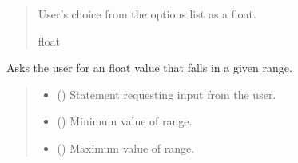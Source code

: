 \documentclass[letterpaper,10pt,english]{sphinxmanual}
\begin{document}
\begin{fulllineitems}
\begin{fulllineitems}
\begin{quote}
\begin{description}
\begin{itemize}
\end{itemize}

\sphinxAtStartPar
User’s choice from the options list as a float.

\sphinxAtStartPar
float

\end{description}\end{quote}

\end{fulllineitems}


\begin{fulllineitems}
\label{\detokenize{Setup.Inputs:Setup.Inputs.GetUserInput.UserInput.AskForFloatInRange}}
\pysigstartsignatures
{}
\pysigstopsignatures
\sphinxAtStartPar
Asks the user for an float value that falls in a given range.
\begin{quote}\begin{description}
\begin{itemize}
\item {} 
\sphinxAtStartPar
{} () \textendash{} Statement requesting input from the user.

\item {} 
\sphinxAtStartPar
{} () \textendash{} Minimum value of range.

\item {} 
\sphinxAtStartPar
{} () \textendash{} Maximum value of range.


\end{itemize}
\end{description}
\end{quote}
\end{fulllineitems}
\end{fulllineitems}
\end{document}

